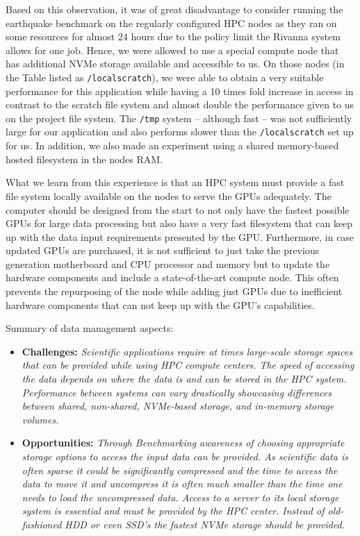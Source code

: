 \documentclass[utf8]{FrontiersinVancouver} %
\begin{document}
Based on this observation, it was of great disadvantage to consider running the earthquake benchmark on the regularly configured HPC  nodes as they ran on some resources for almost 24 hours due to the policy limit the Rivanna system allows for one job. Hence, we were allowed to use a special compute node that has additional NVMe storage available and accessible to us. On those nodes (in the Table listed as \texttt{/localscratch}), we were able to obtain a very suitable performance for this application while having a 10 times fold increase in access in contrast to the scratch file system and almost double the performance given to us on the project file system. The \texttt{/tmp} system -- although fast -- was not sufficiently large for our application and also performs slower than the \texttt{/localscratch} set up for us. In addition, we also made an experiment using a shared memory-based hosted filesystem in the nodes RAM.

What we learn from this experience is that an HPC system must provide a fast file system locally available on the nodes to serve the GPUs adequately. The computer should be designed from the start to not only have the fastest possible GPUs for large data processing but also have a very fast filesystem that can keep up with the data input requirements presented by the GPU. Furthermore, in case updated GPUs are purchased, it is not sufficient to just take the previous generation motherboard and CPU processor and memory but to update the hardware components and include a state-of-the-art compute node. This often prevents the repurposing of the node while adding just GPUs due to inefficient hardware components that can not keep up with the GPU's capabilities.

\begin{tcolorbox}
Summary of data management aspects:

\begin{itemize}

\item {\bf Challenges:} {\it Scientific applications require at times large-scale storage spaces that can be provided while using HPC compute centers. The speed of accessing the data depends on where the data is and can be stored in the HPC system. Performance between systems can vary drastically showcasing differences between shared, non-shared, NVMe-based storage, and in-memory storage volumes.}


\item {\bf Opportunities:} {\it Through Benchmarking awareness of choosing appropriate storage options to access the input data can be provided. As scientific data is often sparse it could be significantly compressed and the time to access the data to move it and uncompress it is often much smaller than the time one needs to load the uncompressed data. Access to a server to its local storage system is essential and must be provided by the HPC center. Instead of old-fashioned HDD or even SSD's the fastest NVMe storage should be provided.}

\end{itemize}
\end{tcolorbox}
  
\end{document}
